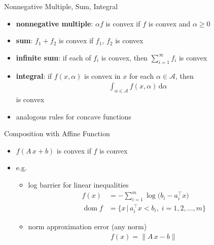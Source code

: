 \documentclass[10pt,handout]{beamer}
\newcommand{\ds}{\displaystyle}
\DeclareMathOperator*{\dom}{dom}
\theoremstyle{definition}
\begin{document}
\begin{frame}{Nonnegative Multiple, Sum, Integral}
  \begin{itemize}
    \item {\bf nonnegative multiple}: $\alpha f$ is convex if $f$ is convex and $\alpha\geqslant 0$
    \item {\bf sum}: $f_1 + f_2$ is convex if $f_1$, $f_2$ is convex
    \item {\bf infinite sum}: if each of $\ds f_i$ is convex, then $\ds\sum_{i = 1}^\infty f_i$ is convex
    \item {\bf integral}: if $\ds f(x, \alpha)$ is convex in $x$ for each $\alpha\in\mathcal{A}$, then 
      \begin{align*}
        \int_{\alpha\in\mathcal{A}}f(x,\alpha)\,\text{d}\alpha
      \end{align*} 
      is convex
    \item analogous rules for concave functions
  \end{itemize}
\end{frame}

\begin{frame}{Composition with Affine Function}
  \begin{itemize}
    \item $\ds f(A\,x + b)$ is convex if $f$ is convex
    \item e.g.
      \begin{itemize}
        \item log barrier for linear inequalities
          \begin{align*}
            f(x) &= - \sum_{i = 1}^m \log\big(b_i - a_i^\top x\big) \\
            \dom f &= \{x\,|\,a_i^\top x < b_i,\;i=1,2,\ldots,m\}
          \end{align*}
        \item norm approximation error (any norm)
          \begin{align*}
            f(x) = \|A\,x - b\|
          \end{align*}
      \end{itemize}
  \end{itemize}
\end{frame}
\end{document}
